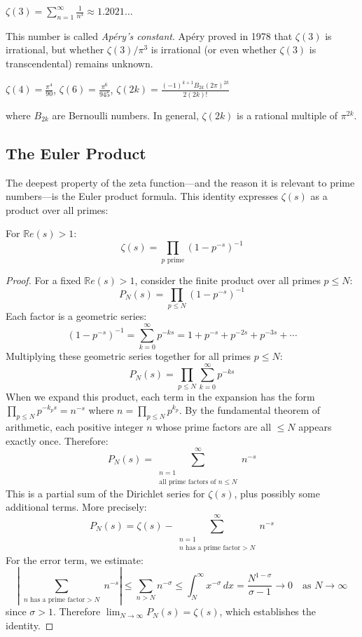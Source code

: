 \begin{example}
$\zeta(3) = \sum_{n=1}^{\infty} \frac{1}{n^3} \approx 1.2021\ldots$

This number is called \textit{Ap\'{e}ry's constant}. Ap\'{e}ry proved in 1978 that $\zeta(3)$ is irrational, but whether $\zeta(3) / \pi^3$ is irrational (or even whether $\zeta(3)$ is transcendental) remains unknown.
\end{example}

\begin{example}
$\zeta(4) = \frac{\pi^4}{90}$, \quad $\zeta(6) = \frac{\pi^6}{945}$, \quad $\zeta(2k) = \frac{(-1)^{k+1} B_{2k} (2\pi)^{2k}}{2(2k)!}$

where $B_{2k}$ are Bernoulli numbers. In general, $\zeta(2k)$ is a rational multiple of $\pi^{2k}$.
\end{example}

\subsection{The Euler Product}

The deepest property of the zeta function---and the reason it is relevant to prime numbers---is the Euler product formula. This identity expresses $\zeta(s)$ as a product over all primes:

\begin{theorem}
\label{thm:euler}
For $\mathbb{R}e(s) > 1$:
\[
\zeta(s) = \prod_{p \text{ prime}} \left(1 - p^{-s}\right)^{-1}
\]
\end{theorem}

\begin{proof}
For a fixed $\mathbb{R}e(s) > 1$, consider the finite product over all primes $p \le N$:
\[
P_N(s) = \prod_{p \le N} \left(1 - p^{-s}\right)^{-1}
\]
Each factor is a geometric series:
\[
\left(1 - p^{-s}\right)^{-1} = \sum_{k=0}^{\infty} p^{-ks} = 1 + p^{-s} + p^{-2s} + p^{-3s} + \cdots
\]
Multiplying these geometric series together for all primes $p \le N$:
\[
P_N(s) = \prod_{p \le N} \sum_{k=0}^{\infty} p^{-ks}
\]
When we expand this product, each term in the expansion has the form $\prod_{p \le N} p^{-k_p s} = n^{-s}$ where $n = \prod_{p \le N} p^{k_p}$. By the fundamental theorem of arithmetic, each positive integer $n$ whose prime factors are all $\le N$ appears exactly once. Therefore:
\[
P_N(s) = \sum_{\substack{n=1 \\ \text{all prime factors of } n \le N}}^{\infty} n^{-s}
\]
This is a partial sum of the Dirichlet series for $\zeta(s)$, plus possibly some additional terms. More precisely:
\[
P_N(s) = \zeta(s) - \sum_{\substack{n=1 \\ n \text{ has a prime factor} > N}}^{\infty} n^{-s}
\]
For the error term, we estimate:
\[
\left|\sum_{\substack{n \text{ has a prime factor} > N}} n^{-s}\right| \le \sum_{n > N} n^{-\sigma} \le \int_N^{\infty} x^{-\sigma} \, dx = \frac{N^{1-\sigma}}{\sigma - 1} \to 0 \quad \text{as } N \to \infty
\]
since $\sigma > 1$. Therefore $\lim_{N \to \infty} P_N(s) = \zeta(s)$, which establishes the identity.
\end{proof}

